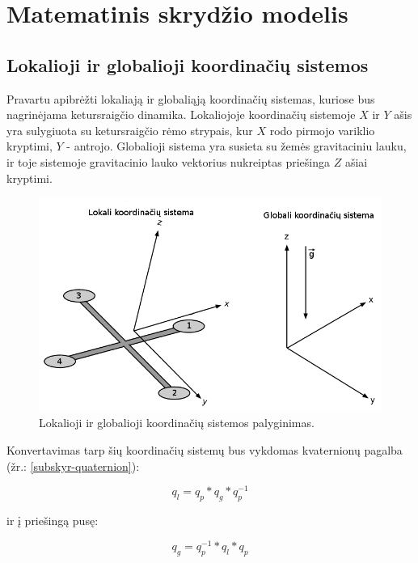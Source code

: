 \documentclass[12pt, a4paper, lithuanian, final]{article}
\begin{document}
\section{Matematinis skrydžio modelis}
\label{skyr-model}



\subsection{Lokalioji ir globalioji koordinačių sistemos}
Pravartu apibrėžti lokaliają ir globaliąją koordinačių sistemas, kuriose bus nagrinėjama ketursraigčio dinamika.
Lokaliojoje koordinačių sistemoje $X$ ir $Y$ ašis yra sulygiuota su ketursraigčio rėmo strypais, kur $X$ rodo pirmojo variklio kryptimi, $Y$ - antrojo.
Globalioji sistema yra susieta su žemės gravitaciniu lauku, ir toje sistemoje gravitacinio lauko vektorius nukreiptas priešinga $Z$ ašiai kryptimi.

\begin{figure}[H]
\begin{center}
\includegraphics[width=1.0\textwidth]{img/Quadcopter_Coordinates.png}
\caption{Lokalioji ir globalioji koordinačių sistemos palyginimas.}
\end{center}
\end{figure}


Konvertavimas tarp šių koordinačių sistemų bus vykdomas kvaternionų pagalba (žr.: \ref{subskyr-quaternion}):

\begin{equation}
	q_{l} = q_{p} * q_{g} * q_{p}^{-1}
\end{equation}

ir į priešingą pusę:

\begin{equation}
	q_{g} = q_{p}^{-1} * q_{l} * q_{p}
\end{equation}
\end{document}
